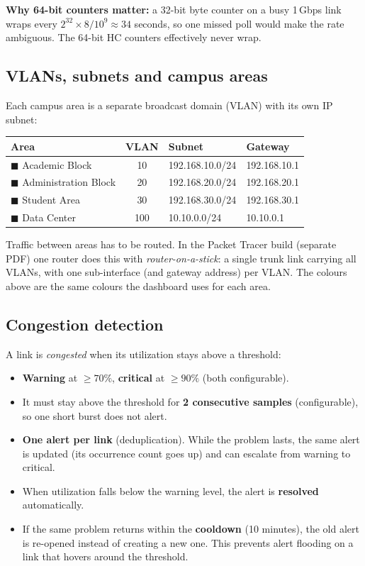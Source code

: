 \documentclass[11pt,a4paper]{article}
\begin{document}
\textbf{Why 64-bit counters matter:} a 32-bit byte counter on a busy 1\,Gbps link wraps every
$2^{32} \times 8 / 10^9 \approx 34$ seconds, so one missed poll would make the rate ambiguous. The 64-bit HC counters effectively
never wrap.

\subsection{VLANs, subnets and campus areas}

Each campus area is a separate broadcast domain (VLAN) with its own IP subnet:

\begin{center}
\begin{tabular}{@{}l c l l@{}}
\toprule
\textbf{Area} & \textbf{VLAN} & \textbf{Subnet} & \textbf{Gateway} \\
\midrule
{\color{acad}$\blacksquare$} Academic Block & 10 & 192.168.10.0/24 & 192.168.10.1 \\
{\color{admin}$\blacksquare$} Administration Block & 20 & 192.168.20.0/24 & 192.168.20.1 \\
{\color{stu}$\blacksquare$} Student Area & 30 & 192.168.30.0/24 & 192.168.30.1 \\
{\color{dc}$\blacksquare$} Data Center & 100 & 10.10.0.0/24 & 10.10.0.1 \\
\bottomrule
\end{tabular}
\end{center}

Traffic between areas has to be routed. In the Packet Tracer build (separate PDF) one router does this with
\emph{router-on-a-stick}: a single trunk link carrying all VLANs, with one sub-interface (and gateway address) per VLAN.
The colours above are the same colours the dashboard uses for each area.

\subsection{Congestion detection}

A link is \emph{congested} when its utilization stays above a threshold:
\begin{itemize}
  \item \textbf{Warning} at $\geq 70\%$, \textbf{critical} at $\geq 90\%$ (both configurable).
  \item It must stay above the threshold for \textbf{2 consecutive samples} (configurable), so one short burst does not alert.
  \item \textbf{One alert per link} (deduplication). While the problem lasts, the same alert is updated (its occurrence count goes up)
        and can escalate from warning to critical.
  \item When utilization falls below the warning level, the alert is \textbf{resolved} automatically.
  \item If the same problem returns within the \textbf{cooldown} (10 minutes), the old alert is re-opened instead of creating a new one.
        This prevents alert flooding on a link that hovers around the threshold.
\end{itemize}
\end{document}
